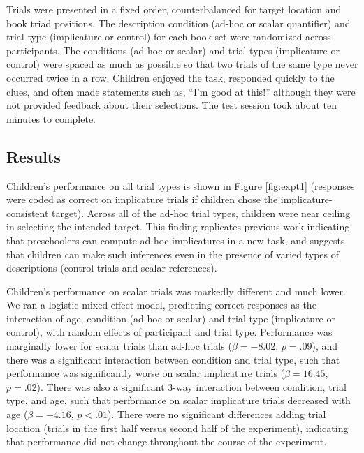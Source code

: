 \documentclass[10pt,letterpaper]{article}
\begin{document}
Trials were presented in a fixed order, counterbalanced for target location and book triad positions.  The description condition (ad-hoc or scalar quantifier) and trial type (implicature or control) for each book set were randomized across participants. The conditions (ad-hoc or scalar) and trial types (implicature or control) were spaced as much as possible so that two trials of the same type never occurred twice in a row. Children enjoyed the task, responded quickly to the clues, and often made statements such as, ``I'm good at this!'' although they were not provided feedback about their selections. The test session took about ten minutes to complete.

\subsection{Results}

Children's performance on all trial types is shown in Figure \ref{fig:expt1} (responses were coded as correct on implicature trials if children chose the implicature-consistent target). Across all of the ad-hoc trial types, children were near ceiling in selecting the intended target. This finding replicates previous work indicating that preschoolers can compute ad-hoc implicatures \citep{stiller2014} in a new task, and suggests that children can make such inferences even in the presence of varied types of descriptions (control trials and scalar references). 

Children's performance on scalar trials was markedly different and much lower. We ran a logistic mixed effect model, predicting correct responses as the interaction of age, condition (ad-hoc or scalar) and trial type (implicature or control), with random effects of participant and trial type. Performance was marginally lower for scalar trials than ad-hoc trials ($\beta = -8.02$, $p =.09$), and there was a significant interaction between condition and trial type, such that performance was significantly worse on scalar implicature trials ($\beta = 16.45$, $p = .02$).  There was also a significant 3-way interaction between condition, trial type, and age, such that performance on scalar implicature trials decreased with age ($\beta = -4.16$, $p < .01$). There were no significant differences adding trial location (trials in the first half versus second half of the experiment), indicating that performance did not change throughout the course of the experiment.
\end{document}

